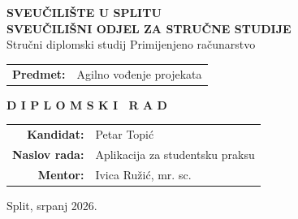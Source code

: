 \begin{titlepage}
    \begin{center}
        \Large \textbf{SVEUČILIŠTE U SPLITU}\\[0.6em]
        \large \textbf{SVEUČILIŠNI ODJEL ZA STRUČNE STUDIJE}\\[0.6em]
        \normalsize Stručni diplomski studij Primijenjeno računarstvo

        \vspace{2cm}

        \large
        \begin{flushleft}
            \hspace*{1.8cm}
            \begin{tabular}{rl}
                \textbf{Predmet:} & \hspace{-0.6em} Agilno vođenje projekata
            \end{tabular}
        \end{flushleft}

        \vspace{1cm}

        \LARGE \textbf{D I P L O M S K I \ R A D}

        \vspace{2cm}

        \large
        \begin{flushleft}
            \hspace*{1cm}
            \begin{tabular}{rl}
                \textbf{Kandidat:} & \hspace{-0.6em} Petar Topić \\[0.5em]
                \textbf{Naslov rada:} & \hspace{-0.6em} Aplikacija za studentsku praksu \\[0.5em]
                \textbf{Mentor:} & \hspace{-0.6em} Ivica Ružić, mr. sc.
            \end{tabular}
        \end{flushleft}

        \vfill

        \normalsize Split, srpanj 2026.
    \end{center}
\end{titlepage}
